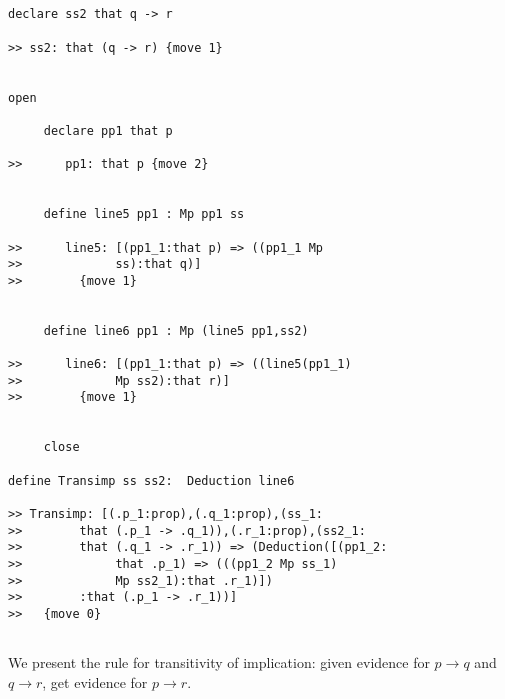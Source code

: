\documentclass[12pt]{article}
\begin{document}
\begin{verbatim}


declare ss2 that q -> r

>> ss2: that (q -> r) {move 1}


open 

     declare pp1 that p

>>      pp1: that p {move 2}


     define line5 pp1 : Mp pp1 ss

>>      line5: [(pp1_1:that p) => ((pp1_1 Mp 
>>             ss):that q)]
>>        {move 1}


     define line6 pp1 : Mp (line5 pp1,ss2)

>>      line6: [(pp1_1:that p) => ((line5(pp1_1) 
>>             Mp ss2):that r)]
>>        {move 1}


     close

define Transimp ss ss2:  Deduction line6

>> Transimp: [(.p_1:prop),(.q_1:prop),(ss_1:
>>        that (.p_1 -> .q_1)),(.r_1:prop),(ss2_1:
>>        that (.q_1 -> .r_1)) => (Deduction([(pp1_2:
>>             that .p_1) => (((pp1_2 Mp ss_1) 
>>             Mp ss2_1):that .r_1)])
>>        :that (.p_1 -> .r_1))]
>>   {move 0}


\end{verbatim}

We present the rule for transitivity of implication:  given evidence for $p \rightarrow q$ and $q \rightarrow r$,
get evidence for $p \rightarrow r$.
\end{document}

